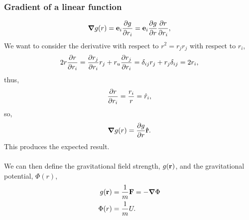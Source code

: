 \documentclass{book}
\begin{document}
\subsubsection{Gradient of a linear function}
\begin{equation}
    \grad g(r) = \vb{e}_i\pdv{g}{r_i} = \vb{e}_i \pdv{g}{r}\pdv{r}{r_i},
\end{equation}
We want to consider the derivative with respect to $r^2 = r_jr_j$ with respect to $r_i$,
\begin{equation}
    \begin{split}
        2r\pdv{r}{r_i} = \pdv{r_j}{r_i}r_j + r_u\pdv{r_j}{r_i} = \delta_{ij}r_j + r_j \delta_{ij}= 2r_i,
    \end{split}
\end{equation}
thus,
\begin{equation}
    \pdv{r}{r_i} = \frac{r_i}{r} = \Hat{r}_i,
\end{equation}
so,
\begin{equation}
    \grad g(r) = \pdv{g}{r}\vu{r}.
\end{equation}
This produces the expected result. \\\\
We can then define the gravitational field strength, $g(\vb{r})$, and the gravitational potential, $\Phi(r)$,
\begin{align}
    g(\vb{r}) &= \frac{1}{m}\vb{F} = -\grad \Phi \label{fieldstr}\\
    \Phi(r) & = \frac{1}{m}U.\label{potential}
\end{align}
\end{document}
